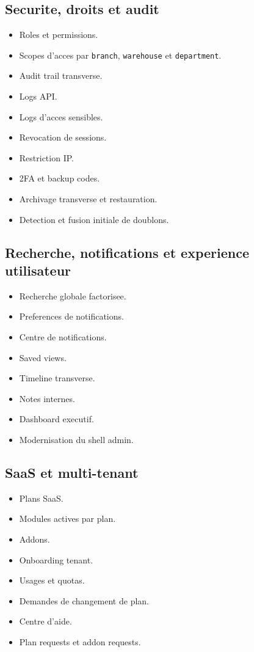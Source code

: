 \documentclass[11pt,a4paper]{article}
\begin{document}
\subsection{Securite, droits et audit}
\begin{itemize}[leftmargin=1.2cm]
    \item Roles et permissions.
    \item Scopes d'acces par \texttt{branch}, \texttt{warehouse} et \texttt{department}.
    \item Audit trail transverse.
    \item Logs API.
    \item Logs d'acces sensibles.
    \item Revocation de sessions.
    \item Restriction IP.
    \item 2FA et backup codes.
    \item Archivage transverse et restauration.
    \item Detection et fusion initiale de doublons.
\end{itemize}

\subsection{Recherche, notifications et experience utilisateur}
\begin{itemize}[leftmargin=1.2cm]
    \item Recherche globale factorisee.
    \item Preferences de notifications.
    \item Centre de notifications.
    \item Saved views.
    \item Timeline transverse.
    \item Notes internes.
    \item Dashboard executif.
    \item Modernisation du shell admin.
\end{itemize}

\subsection{SaaS et multi-tenant}
\begin{itemize}[leftmargin=1.2cm]
    \item Plans SaaS.
    \item Modules actives par plan.
    \item Addons.
    \item Onboarding tenant.
    \item Usages et quotas.
    \item Demandes de changement de plan.
    \item Centre d'aide.
    \item Plan requests et addon requests.
\end{itemize}
\end{document}
